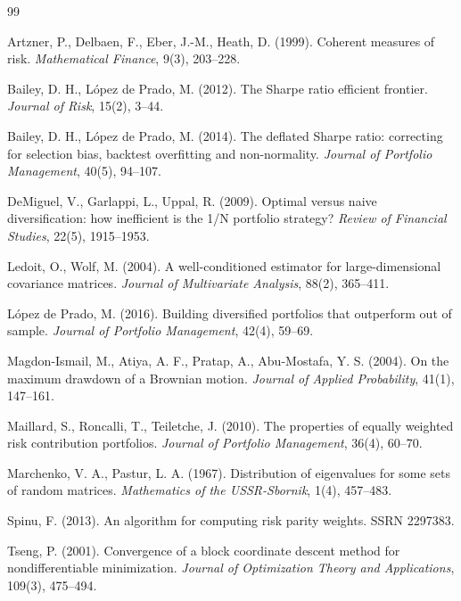 \documentclass[11pt,a4paper]{article}
\theoremstyle{pdef}
\theoremstyle{pstate}
\begin{document}
\clearpage
{}
{}
\renewcommand{\refname}{Références}
\begin{thebibliography}{99}\small
\setlength{\itemsep}{2pt}

Artzner, P., Delbaen, F., Eber, J.-M., Heath, D. (1999). Coherent measures of risk.
\emph{Mathematical Finance}, 9(3), 203--228.

Bailey, D. H., López de Prado, M. (2012). The Sharpe ratio efficient frontier.
\emph{Journal of Risk}, 15(2), 3--44.

Bailey, D. H., López de Prado, M. (2014). The deflated Sharpe ratio: correcting for
selection bias, backtest overfitting and non-normality. \emph{Journal of Portfolio
Management}, 40(5), 94--107.

DeMiguel, V., Garlappi, L., Uppal, R. (2009). Optimal versus naive diversification: how
inefficient is the 1/N portfolio strategy? \emph{Review of Financial Studies}, 22(5),
1915--1953.

Ledoit, O., Wolf, M. (2004). A well-conditioned estimator for large-dimensional
covariance matrices. \emph{Journal of Multivariate Analysis}, 88(2), 365--411.

López de Prado, M. (2016). Building diversified portfolios that outperform out of
sample. \emph{Journal of Portfolio Management}, 42(4), 59--69.

Magdon-Ismail, M., Atiya, A. F., Pratap, A., Abu-Mostafa, Y. S. (2004). On the maximum
drawdown of a Brownian motion. \emph{Journal of Applied Probability}, 41(1), 147--161.

Maillard, S., Roncalli, T., Teiletche, J. (2010). The properties of equally weighted
risk contribution portfolios. \emph{Journal of Portfolio Management}, 36(4), 60--70.

Marchenko, V. A., Pastur, L. A. (1967). Distribution of eigenvalues for some sets of
random matrices. \emph{Mathematics of the USSR-Sbornik}, 1(4), 457--483.

Spinu, F. (2013). An algorithm for computing risk parity weights. SSRN 2297383.

Tseng, P. (2001). Convergence of a block coordinate descent method for nondifferentiable
minimization. \emph{Journal of Optimization Theory and Applications}, 109(3), 475--494.

\end{thebibliography}
\end{document}
